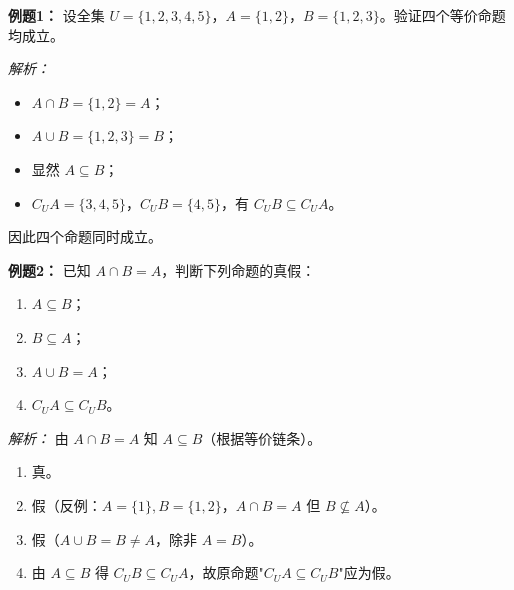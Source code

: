 \begin{examplebox}
\textbf{例题1：} 设全集 $U=\{1,2,3,4,5\}$，$A=\{1,2\}$，$B=\{1,2,3\}$。验证四个等价命题均成立。

\textit{解析：} 
\begin{itemize}
    \item $A\cap B = \{1,2\} = A$；
    \item $A\cup B = \{1,2,3\} = B$；
    \item 显然 $A\subseteq B$；
    \item $C_U A = \{3,4,5\}$，$C_U B = \{4,5\}$，有 $C_U B \subseteq C_U A$。
\end{itemize}
因此四个命题同时成立。
\end{examplebox}

\begin{examplebox}
\textbf{例题2：} 已知 $A\cap B = A$，判断下列命题的真假：
\begin{enumerate}
    \item $A\subseteq B$；
    \item $B\subseteq A$；
    \item $A\cup B = A$；
    \item $C_U A \subseteq C_U B$。
\end{enumerate}

\textit{解析：} 由 $A\cap B = A$ 知 $A\subseteq B$（根据等价链条）。
\begin{enumerate}
    \item 真。
    \item 假（反例：$A=\{1\},B=\{1,2\}$，$A\cap B=A$ 但 $B\not\subseteq A$）。
    \item 假（$A\cup B = B \neq A$，除非 $A=B$）。
    \item 由 $A\subseteq B$ 得 $C_U B \subseteq C_U A$，故原命题"$C_U A \subseteq C_U B$"应为假。
\end{enumerate}
\end{examplebox}